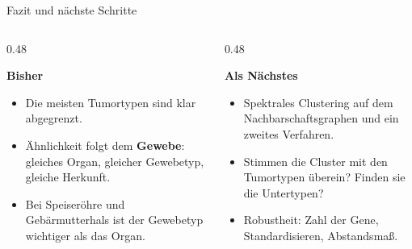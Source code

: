 \documentclass[aspectratio=169,11pt]{beamer}
\newcommand{\kastentitel}[1]{{\color{blau}\textbf{#1}}\par\smallskip}
\begin{document}
\begin{frame}{Fazit und nächste Schritte}
  \begin{columns}[t]
    \begin{column}{0.48\textwidth}
      \begin{kasten}
        \kastentitel{Bisher}
        \small
        \begin{itemize}
          \item Die meisten Tumortypen sind klar abgegrenzt.
          \item Ähnlichkeit folgt dem \textbf{Gewebe}: gleiches Organ, gleicher Gewebetyp, gleiche Herkunft.
          \item Bei Speiseröhre und Gebärmutterhals ist der Gewebetyp wichtiger als das Organ.
        \end{itemize}
      \end{kasten}
    \end{column}
    \begin{column}{0.48\textwidth}
      \begin{kasten}
        \kastentitel{Als Nächstes}
        \small
        \begin{itemize}
          \item Spektrales Clustering auf dem Nachbarschaftsgraphen und ein zweites Verfahren.
          \item Stimmen die Cluster mit den Tumortypen überein? Finden sie die Untertypen?
          \item Robustheit: Zahl der Gene, Standardisieren, Abstandsmaß.
        \end{itemize}
      \end{kasten}
    \end{column}
  \end{columns}
\end{frame}
\end{document}
